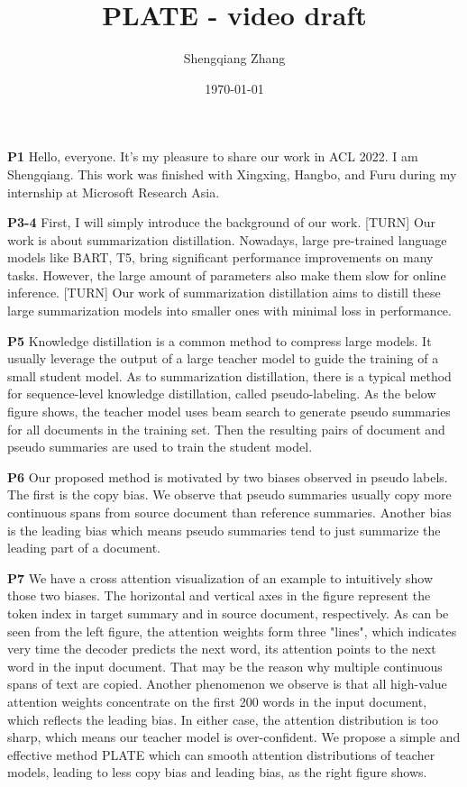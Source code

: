 \documentclass[a4paper, 12pt]{article}
\title{\textbf{PLATE - video draft}}
\author{Shengqiang Zhang}
\date{\today}
\begin{document}
\maketitle

\textbf{P1} Hello, everyone. It's my pleasure to share our work in ACL 2022. I am Shengqiang. This work was finished with Xingxing, Hangbo, and Furu during my internship at Microsoft Research Asia. 

\textbf{P3-4} First, I will simply introduce the background of our work. 
[TURN]
Our work is about summarization distillation.
Nowadays, large pre-trained language models like BART, T5, bring significant performance improvements on many tasks.
However, the large amount of parameters also make them slow for online inference.
[TURN]
Our work of summarization distillation aims to distill these large summarization models into smaller ones with minimal loss in performance.

\textbf{P5} 
Knowledge distillation is a common method to compress large models. It usually leverage the output of a large teacher model to guide the training of a small student model.
As to summarization distillation, there is a typical method for sequence-level knowledge distillation, called pseudo-labeling. 
As the below figure shows, the teacher model uses beam search to generate pseudo summaries for all documents in the training set. Then the resulting pairs of document and pseudo summaries are used to train the student model.

\textbf{P6}
Our proposed method is motivated by two biases observed in pseudo labels. The first is the copy bias. We observe that pseudo summaries usually copy more continuous spans from source document than reference summaries. Another bias is the leading bias which means pseudo summaries tend to just summarize the leading part of a document.

\textbf{P7}
We have a cross attention visualization of an example to intuitively show those two biases. 
The horizontal and vertical axes in the figure represent the token index in target summary and in source document, respectively. As can be seen from the left figure, the attention weights form three "lines", which indicates very time the decoder predicts the next word, its attention points to the next word in the input document. That may be the reason why multiple continuous spans of text are copied.
Another phenomenon we observe is that all high-value attention weights concentrate on the first 200 words in the input document, which reflects the leading bias. In either case, the attention distribution is too sharp, which means our teacher model is over-confident.
We propose a simple and effective method PLATE which can smooth attention distributions of teacher models, leading to less copy bias and leading bias, as the right figure shows.
\end{document}
